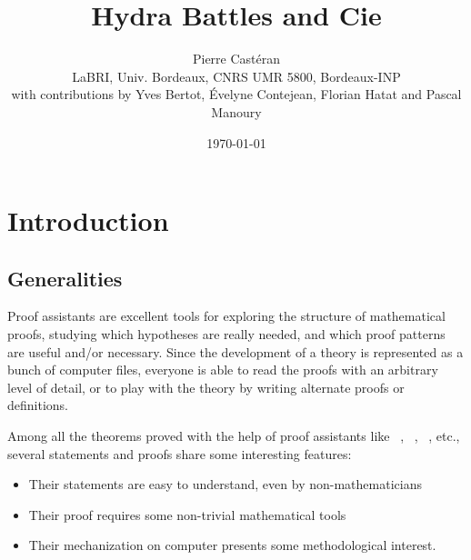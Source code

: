 \documentclass[a4paper]{book}
\author{Pierre Castéran\\ LaBRI, Univ. Bordeaux, CNRS UMR 5800, Bordeaux-INP\\with contributions by Yves Bertot, \'Evelyne Contejean,  Florian Hatat and Pascal Manoury}
\date{\today}
\title{Hydra Battles and Cie}
\begin{document}
\maketitle
















\tableofcontents
 


\chapter{Introduction}

  

\vspace{16pt}

\section{Generalities}

Proof assistants are excellent tools for exploring the structure of mathematical proofs,
studying  which hypotheses are really needed, and which proof patterns are useful and/or
necessary. Since the development of a theory is represented as a bunch of computer files,
everyone is able to read the proofs with an arbitrary level of detail, or to play with the theory by writing alternate proofs or definitions.


Among all the theorems proved with the help of proof assistants like \coq{}~\cite{Coq,BC04}, \hol{}~\cite{HOL}, \isabelle{}~\cite{isabelle},  etc.,
several statements and proofs  share some interesting features:
\begin{itemize}
\item Their statements are easy to understand, even by non-mathematicians
\item Their proof requires some non-trivial mathematical tools
\item Their mechanization on computer presents some methodological interest.
\end{itemize}
\end{document}
